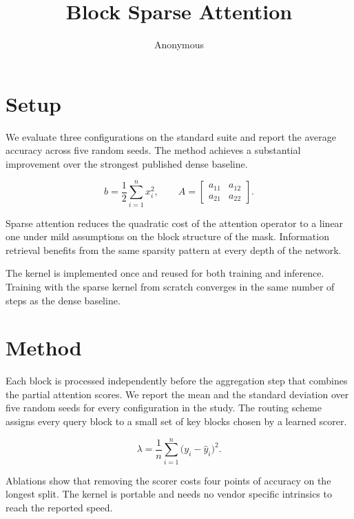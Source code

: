 \documentclass[10pt,twocolumn]{article}
\title{Block Sparse Attention}
\author{Anonymous}
\date{}
\newcommand{\s}[1]{#1}
\begin{document}
\maketitle

\section{Setup}

\s{We evaluate three configurations on the standard suite and report the average accuracy across five random seeds.}
\s{The method achieves a substantial improvement over the strongest published dense baseline.}

\vspace{-0.6em}
\begin{equation}
b = \frac{1}{2}\sum_{i=1}^{n} x_i^2 , \qquad A = \begin{bmatrix} a_{11} & a_{12} \\ a_{21} & a_{22} \end{bmatrix} .
\end{equation}
\vspace{-0.6em}

\noindent
\s{Sparse attention reduces the quadratic cost of the attention operator to a linear one under mild assumptions on the block structure of the mask.}
\s{Information retrieval benefits from the same sparsity pattern at every depth of the network.}

\s{The kernel is implemented once and reused for both training and inference.}
\s{Training with the sparse kernel from scratch converges in the same number of steps as the dense baseline.}

\section{Method}

\s{Each block is processed independently before the aggregation step that combines the partial attention scores.}
\s{We report the mean and the standard deviation over five random seeds for every configuration in the study.}
\s{The routing scheme assigns every query block to a small set of key blocks chosen by a learned scorer.}

\vspace{-0.6em}
\begin{equation}
\lambda = \frac{1}{n}\sum_{i=1}^{n} \bigl( y_i - \hat{y}_i \bigr)^2 .
\end{equation}
\vspace{-0.6em}

\noindent
\s{Ablations show that removing the scorer costs four points of accuracy on the longest split.}
\s{The kernel is portable and needs no vendor specific intrinsics to reach the reported speed.}
\end{document}
